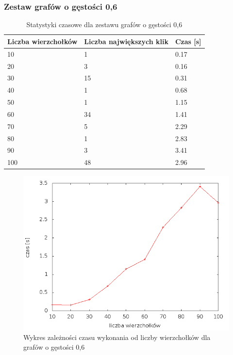 \documentclass[12pt, a4paper]{article}
\begin{document}
\subsubsection*{Zestaw grafów o gęstości 0,6}
\begin{table}[H]
\caption{Statystyki czasowe dla zestawu grafów o gęstości 0,6}
\begin{center}
    \begin{tabular}{|l|l|l|}
    \hline
    Liczba wierzchołków & Liczba największych klik & Czas [s] \\ \hline
    10 & 1 & 0.17 \\ \hline
    20 & 3 & 0.16 \\ \hline
    30 & 15 & 0.31 \\ \hline
    40 & 1 & 0.68 \\ \hline
    50 & 1 & 1.15 \\ \hline
    60 & 34 & 1.41 \\ \hline
    70 & 5 & 2.29 \\ \hline
    80 & 1 & 2.83 \\ \hline
    90 & 3 & 3.41 \\ \hline
    100 & 48 & 2.96 \\ \hline
    \end{tabular}
\end{center}
\end{table}

\begin{figure}[h]
    \begin{center}
	\includegraphics[scale=0.5]{../experiment_1/img/den/den_06.png}
	\caption{Wykres zależności czasu wykonania od liczby wierzchołków dla grafów o gęstości 0,6}
    \end{center}
\end{figure}
\end{document}
